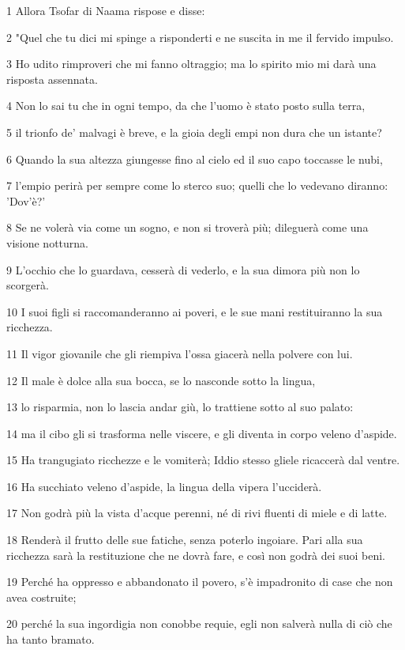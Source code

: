 \par 1 Allora Tsofar di Naama rispose e disse:
\par 2 "Quel che tu dici mi spinge a risponderti e ne suscita in me il fervido impulso.
\par 3 Ho udito rimproveri che mi fanno oltraggio; ma lo spirito mio mi darà una risposta assennata.
\par 4 Non lo sai tu che in ogni tempo, da che l'uomo è stato posto sulla terra,
\par 5 il trionfo de' malvagi è breve, e la gioia degli empi non dura che un istante?
\par 6 Quando la sua altezza giungesse fino al cielo ed il suo capo toccasse le nubi,
\par 7 l'empio perirà per sempre come lo sterco suo; quelli che lo vedevano diranno: 'Dov'è?'
\par 8 Se ne volerà via come un sogno, e non si troverà più; dileguerà come una visione notturna.
\par 9 L'occhio che lo guardava, cesserà di vederlo, e la sua dimora più non lo scorgerà.
\par 10 I suoi figli si raccomanderanno ai poveri, e le sue mani restituiranno la sua ricchezza.
\par 11 Il vigor giovanile che gli riempiva l'ossa giacerà nella polvere con lui.
\par 12 Il male è dolce alla sua bocca, se lo nasconde sotto la lingua,
\par 13 lo risparmia, non lo lascia andar giù, lo trattiene sotto al suo palato:
\par 14 ma il cibo gli si trasforma nelle viscere, e gli diventa in corpo veleno d'aspide.
\par 15 Ha trangugiato ricchezze e le vomiterà; Iddio stesso gliele ricaccerà dal ventre.
\par 16 Ha succhiato veleno d'aspide, la lingua della vipera l'ucciderà.
\par 17 Non godrà più la vista d'acque perenni, né di rivi fluenti di miele e di latte.
\par 18 Renderà il frutto delle sue fatiche, senza poterlo ingoiare. Pari alla sua ricchezza sarà la restituzione che ne dovrà fare, e così non godrà dei suoi beni.
\par 19 Perché ha oppresso e abbandonato il povero, s'è impadronito di case che non avea costruite;
\par 20 perché la sua ingordigia non conobbe requie, egli non salverà nulla di ciò che ha tanto bramato.
